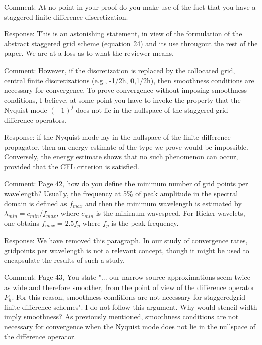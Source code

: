 Comment: At no point in your proof do you make use of the fact that you have a staggered finite difference discretization. 

Response: This is an astonishing statement, in view of the formulation of the abstract staggered grid scheme (equation 24) and its use througout the rest of the paper. We are at a loss as to what the reviewer means.

Comment: However, if the discretization is replaced by the collocated grid, central finite discretizations (e.g., -1/2h, 0,1/2h), then smoothness conditions are necessary for convergence. To prove convergence without imposing smoothness conditions, I believe, at some point you have to invoke the property that the Nyquist mode $(-1)^j$ does not lie in the nullspace of the staggered grid difference operators. 

Response: if the Nyquist mode lay in the nullspace of the finite difference propagator, then an energy estimate of the type we prove would be impossible. Conversely, the energy estimate shows that no such phenomenon can occur, provided that the CFL criterion is satisfied.


Comment: Page 42, how do you define the minimum number of grid points per wavelength? Usually, the frequency at 5\% of
peak amplitude in the spectral domain is defined as $f_{max}$ and then the minimum wavelength is estimated by $ \lambda_{min} = c_{min}/f_{max}$, where $c_{min}$ is the minimum wavespeed. For Ricker wavelets, one obtains $f_{max} = 2.5 f_p$ where $f_p$ is the peak frequency.  


Response: We have removed this paragraph. In our study of convergence rates, gridpoints per wavelength is not a relevant concept, though it might be used to encapsulate the results of such a study.

Comment: Page 43, You state "... our narrow source approximations seem twice as wide and therefore smoother, from the point of view of the difference operator $P_h$. For this reason, smoothness conditions are not necessary for staggeredgrid finite difference schemes". I do not follow this argument. Why would stencil width imply smoothness? As previously mentioned, smoothness conditions are not necessary for convergence when the Nyquist mode does not lie in the nullspace of the difference operator.  

